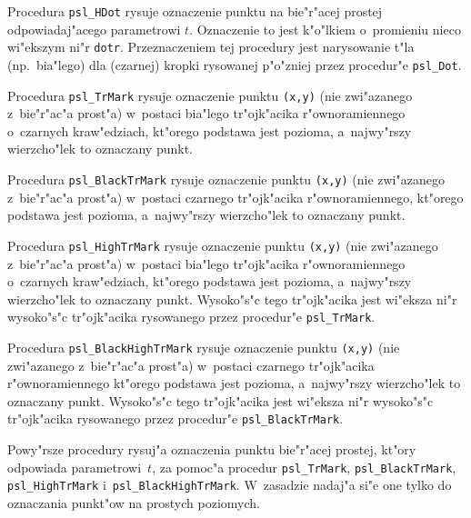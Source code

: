 \vspace{\bigskipamount}
Procedura \texttt{psl\_HDot} rysuje oznaczenie punktu na bie"r"acej prostej
odpowiadaj"acego parametrowi $t$. Oznaczenie to jest k"o"lkiem o~promieniu
nieco wi"ekszym ni"r \texttt{dotr}. Przeznaczeniem tej procedury jest
narysowanie t"la (np.\ bia"lego) dla (czarnej) kropki rysowanej p"o"zniej
przez procedur"e \texttt{psl\_Dot}.

\vspace{\bigskipamount}
Procedura \texttt{psl\_TrMark} rysuje oznaczenie punktu \texttt{(x,y)} (nie
zwi"azanego z~bie"r"ac"a prost"a) w~postaci bia"lego tr"ojk"acika
r"ownoramiennego o~czarnych kraw"edziach,
kt"orego podstawa jest pozioma, a~najwy"rszy wierzcho"lek to oznaczany
punkt.

\vspace{\bigskipamount}
Procedura \texttt{psl\_BlackTrMark} rysuje oznaczenie punktu \texttt{(x,y)}
(nie zwi"azanego z~bie"r"ac"a prost"a) w~postaci czarnego tr"ojk"acika
r"ownoramiennego, kt"orego podstawa jest pozioma, a~najwy"rszy wierzcho"lek
to oznaczany punkt.

\vspace{\bigskipamount}
Procedura \texttt{psl\_HighTrMark} rysuje oznaczenie punktu \texttt{(x,y)}
(nie zwi"azanego z~bie"r"ac"a prost"a) w~postaci bia"lego tr"ojk"acika
r"ownoramiennego o~czarnych kraw"edziach,
kt"orego podstawa jest pozioma, a~najwy"rszy wierzcho"lek to oznaczany
punkt. Wysoko"s"c tego tr"ojk"acika jest wi"eksza ni"r wysoko"s"c
tr"ojk"acika rysowanego przez procedur"e \texttt{psl\_TrMark}.

\vspace{\bigskipamount}
Procedura \texttt{psl\_BlackHighTrMark} rysuje oznaczenie punktu
\texttt{(x,y)} (nie zwi"azanego z~bie"r"ac"a prost"a) w~postaci czarnego
tr"ojk"acika r"ownoramiennego kt"orego podstawa jest pozioma, a~najwy"rszy
wierzcho"lek to oznaczany punkt. Wysoko"s"c tego tr"ojk"acika jest wi"eksza
ni"r wysoko"s"c tr"ojk"acika rysowanego przez procedur"e
\texttt{psl\_BlackTrMark}.

\vspace{\bigskipamount}
\begin{sloppypar}
Powy"rsze procedury rysuj"a oznaczenia punktu bie"r"acej prostej, kt"ory
od\-po\-wia\-da parametrowi~$t$, za pomoc"a procedur \texttt{psl\_TrMark},
\texttt{psl\_BlackTrMark}, \texttt{psl\_HighTrMark}
i~\texttt{psl\_BlackHighTrMark}. W~zasadzie nadaj"a si"e one tylko
do oznaczania punkt"ow na prostych poziomych.
\end{sloppypar}

